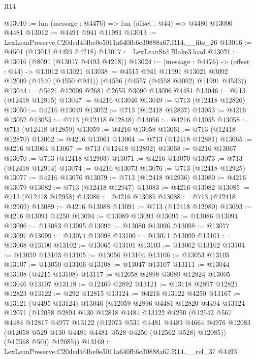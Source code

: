 \begin{lexlean}{R14}
\begin{coremodule}
@13010 := fun (message : @4476) => fun (offset : @44) => @4480 @13006 @4481
@13012 := @4491 @941 @11991
@13013 := LexLeanPreserve.C20ded4f4be0e5011a640fb6c30888a67.R14.__fits_26
@13016 := @4501 (@13013 @4493 @4218)
@13017 := LexLeanStd.Blake3.load
@13021 := @13016 (@8091 (@13017 @4493 @4218))
@13024 := (message : @4476) -> (offset : @44) -> @13012 @13021
@13038 := @4515
    @941
    @11991
    @13021
    @3092
    @12009
    (@4540 (@4550 @941))
    (@4556 (@4557 (@4558 @3092) @11991 @4533))
@13044 := @5621 @12009 @2681 @2655 @3090 @13006 @4481
@13046 := @713 (@12418 @12815)
@13047 := @4216 @13046
@13049 := @713 (@12418 @12826)
@13050 := @4216 @13049
@13052 := @713 (@12418 @12837)
@13053 := @4216 @13052
@13055 := @713 (@12418 @12848)
@13056 := @4216 @13055
@13058 := @713 (@12418 @12859)
@13059 := @4216 @13058
@13061 := @713 (@12418 @12870)
@13062 := @4216 @13061
@13064 := @713 (@12418 @12881)
@13065 := @4216 @13064
@13067 := @713 (@12418 @12892)
@13068 := @4216 @13067
@13070 := @713 (@12418 @12903)
@13071 := @4216 @13070
@13073 := @713 (@12418 @12914)
@13074 := @4216 @13073
@13076 := @713 (@12418 @12925)
@13077 := @4216 @13076
@13079 := @713 (@12418 @12936)
@13080 := @4216 @13079
@13082 := @713 (@12418 @12947)
@13083 := @4216 @13082
@13085 := @713 (@12418 @12958)
@13086 := @4216 @13085
@13088 := @713 (@12418 @12969)
@13089 := @4216 @13088
@13091 := @713 (@12418 @12980)
@13093 := @4216 @13091 @4250
@13094 := @13089 @13093
@13095 := @13086 @13094
@13096 := @13083 @13095
@13097 := @13080 @13096
@13098 := @13077 @13097
@13099 := @13074 @13098
@13100 := @13071 @13099
@13101 := @13068 @13100
@13102 := @13065 @13101
@13103 := @13062 @13102
@13104 := @13059 @13103
@13105 := @13056 @13104
@13106 := @13053 @13105
@13107 := @13050 @13106
@13108 := @13047 @13107
@13111 := @13044 @13108 (@4215 @13108)
@13117 := @12058 @2898 @3089 @12824 @13005 @13046 @13107
@13118 := @12469 @2892
@13121 := @13118 @2897 @12821 @12823
@13122 := @292 @12815
@13124 := @4216 @13122 @4250
@13167 := @13121
    (@4495 @13124)
    @13046
    (@12059
      @2896
      @4481
      @12820
      @4494
      @13124
      @12071
      (@12058
        @2894
        @130
        @12818
        @4481
        @13122
        @4250
        (@12542
          @567
          @4484
          @12817
          @4977
          @13122
          (@12073
            @531
            @4481
            @4483
            @4664
            @4976
            @12083
            (@12058 @529 @130 @4481 @4481 @528 @4250 (@12562 @528) @12085))
          (@12568 @50))
        @12085))
@13169 := LexLeanPreserve.C20ded4f4be0e5011a640fb6c30888a67.R14.__rel_37 @4493

\end{coremodule}
\end{lexlean}

